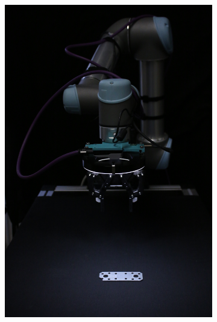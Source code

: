 \begin{figure}[htbp]
\begin{subfigure}[b]{0.3\textwidth}
    \end{subfigure}
    \begin{subfigure}[b]{0.3\textwidth}
        \centering
        \includegraphics[angle=90, width=\textwidth]{figures/setupimages/setup_flachverbinder.JPG}


\end{subfigure}
\end{figure}
